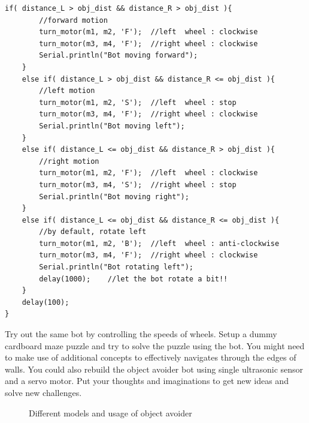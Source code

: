 \begin{lstlisting}[style=CStyle]
    if( distance_L > obj_dist && distance_R > obj_dist ){
        //forward motion
        turn_motor(m1, m2, 'F');  //left  wheel : clockwise
        turn_motor(m3, m4, 'F');  //right wheel : clockwise
        Serial.println("Bot moving forward");
    }
    else if( distance_L > obj_dist && distance_R <= obj_dist ){
        //left motion
        turn_motor(m1, m2, 'S');  //left  wheel : stop
        turn_motor(m3, m4, 'F');  //right wheel : clockwise
        Serial.println("Bot moving left");
    }
    else if( distance_L <= obj_dist && distance_R > obj_dist ){
        //right motion
        turn_motor(m1, m2, 'F');  //left  wheel : clockwise
        turn_motor(m3, m4, 'S');  //right wheel : stop
        Serial.println("Bot moving right");
    }
    else if( distance_L <= obj_dist && distance_R <= obj_dist ){
        //by default, rotate left
        turn_motor(m1, m2, 'B');  //left  wheel : anti-clockwise
        turn_motor(m3, m4, 'F');  //right wheel : clockwise
        Serial.println("Bot rotating left");
        delay(1000); 	//let the bot rotate a bit!!
    }
    delay(100);
}
\end{lstlisting}

\par Try out the same bot by controlling the speeds of wheels. Setup a dummy cardboard maze puzzle and try to solve the puzzle using the bot. You might need to make use of additional concepts to effectively navigates through the edges of walls. You could also rebuild the object avoider bot using single ultrasonic sensor and a servo motor. Put your thoughts and imaginations to get new ideas and solve new challenges.

\begin{figure}
    \centering
    \quad
    \caption[Object Avoider Bots]{Different models and usage of object avoider}
\end{figure}